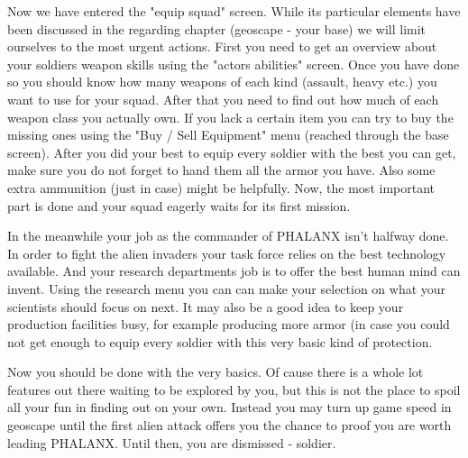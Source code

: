 Now we have entered the "equip squad" screen. While its particular elements have been discussed in the regarding chapter (geoscape - your base) we will limit ourselves to the most urgent actions. First you need to get an overview about your soldiers weapon skills using the "actors abilities" screen. Once you have done so you should know how many weapons of each kind (assault, heavy etc.) you want to use for your squad. After that you need to find out how much of each weapon class you actually own. If you lack a certain item you can try to buy the missing ones using the "Buy / Sell Equipment" menu (reached through the base screen). After you did your best to equip every soldier with the best you can get, make sure you do not forget to hand them all the armor you have. Also some extra ammunition (just in case) might be helpfully. Now, the most important part is done and your squad eagerly waits for its first mission.

In the meanwhile your job as the commander of PHALANX isn't halfway done. In order to fight the alien invaders your task force relies on the best technology available. And your research departments job is to offer the best human mind can invent. Using the research menu you can can make your selection on what your scientists should focus on next. It may also be a good idea to keep your production facilities busy, for example producing more armor (in case you could not get enough to equip every soldier with this very basic kind of protection.

Now you should be done with the very basics. Of cause there is a whole lot features out there waiting to be explored by you, but this is not the place to spoil all your fun in finding out on your own. Instead you may turn up game speed in geoscape until the first alien attack offers you the chance to proof you are worth leading PHALANX. Until then, you are dismissed - soldier.


